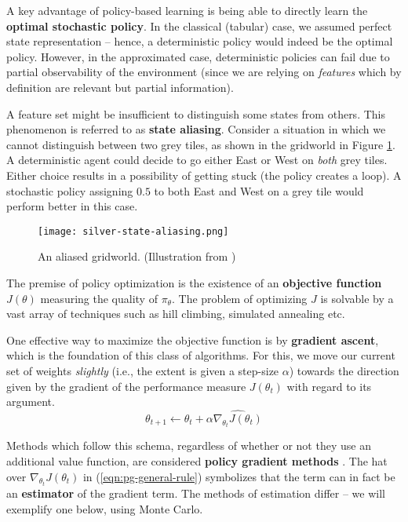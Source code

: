 A key advantage of policy-based learning is being able to directly learn the \textbf{optimal stochastic policy}.
In the classical (tabular) case, we assumed perfect state representation -- hence, a deterministic policy would indeed be the optimal policy.
However, in the approximated case, deterministic policies can fail due to partial observability of the environment (since we are relying on \emph{features} which by definition are relevant but partial information).

A feature set might be insufficient to distinguish some states from others. This phenomenon is referred to as \textbf{state aliasing}.
Consider a situation in which we cannot distinguish between two grey tiles, as shown in the gridworld in Figure \ref{fig:state-aliasing}.
A deterministic agent could decide to go either East or West on \emph{both} grey tiles.
Either choice results in a possibility of getting stuck (the policy creates a loop).
A stochastic policy assigning $0.5$ to both East and West on a grey tile would perform better in this case.

\begin{figure}[h]
    \centering
    \texttt{[image: silver-state-aliasing.png]}
    \caption{An aliased gridworld. (Illustration from \cite{silver-lectures})}
    \label{fig:state-aliasing}
\end{figure}

The premise of policy optimization is the existence of an \textbf{objective function} $J(\theta)$ measuring the quality of $\pi_{\theta}$.
The problem of optimizing $J$ is solvable by a vast array of techniques such as hill climbing, simulated annealing etc.

One effective way to maximize the objective function is by \textbf{gradient ascent}, which is the foundation of this class of algorithms.
For this, we move our current set of weights \emph{slightly} (i.e., the extent is given a step-size $\alpha$) towards the direction given by the gradient of the performance measure $J(\theta_{t})$ with regard to its argument.
\begin{equation} \label{eqn:pg-general-rule}
    \theta_{t+1} \leftarrow \theta_{t} + \alpha \widehat{ \nabla_{\theta_{t}} J(\theta_{t}) }
\end{equation}

Methods which follow this schema, regardless of whether or not they use an additional value function, are considered \textbf{policy gradient methods} \cite{rlai}.
The hat over $\nabla_{\theta_{t}} J(\theta_{t})$ in (\ref{eqn:pg-general-rule}) symbolizes that the term can in fact be an \textbf{estimator} of the gradient term. The methods of estimation differ -- we will exemplify one below, using Monte Carlo.

